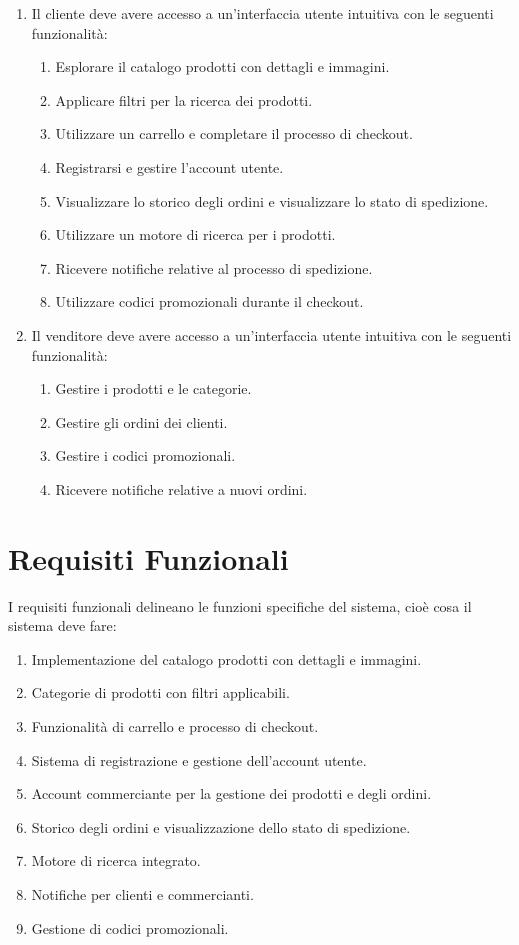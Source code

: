 \begin{enumerate}
    \item Il cliente deve avere accesso a un'interfaccia utente intuitiva con le seguenti funzionalità:
          \begin{enumerate}
              \item Esplorare il catalogo prodotti con dettagli e immagini.
              \item Applicare filtri per la ricerca dei prodotti.
              \item Utilizzare un carrello e completare il processo di checkout.
              \item Registrarsi e gestire l'account utente.
              \item Visualizzare lo storico degli ordini e visualizzare lo stato di spedizione.
              \item Utilizzare un motore di ricerca per i prodotti.
              \item Ricevere notifiche relative al processo di spedizione.
              \item Utilizzare codici promozionali durante il checkout.
          \end{enumerate}
    \item Il venditore deve avere accesso a un'interfaccia utente intuitiva con le seguenti funzionalità:
          \begin{enumerate}
              \item Gestire i prodotti e le categorie.
              \item Gestire gli ordini dei clienti.
              \item Gestire i codici promozionali.
              \item Ricevere notifiche relative a nuovi ordini.
          \end{enumerate}
\end{enumerate}

\section{Requisiti Funzionali}
I requisiti funzionali delineano le funzioni specifiche del sistema, cioè cosa il sistema deve fare:
\begin{enumerate}
    \item Implementazione del catalogo prodotti con dettagli e immagini.
    \item Categorie di prodotti con filtri applicabili.
    \item Funzionalità di carrello e processo di checkout.
    \item Sistema di registrazione e gestione dell'account utente.
    \item Account commerciante per la gestione dei prodotti e degli ordini.
    \item Storico degli ordini e visualizzazione dello stato di spedizione.
    \item Motore di ricerca integrato.
    \item Notifiche per clienti e commercianti.
    \item Gestione di codici promozionali.
\end{enumerate}

